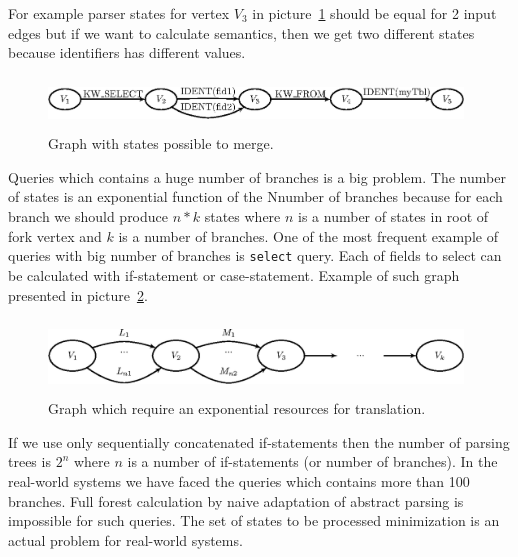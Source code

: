 For example parser states for vertex $V_3$ in picture~\ref{pic4} should be equal for 2 input edges
but if we want to calculate semantics, then we get two different states because identifiers has 
different values.

\begin{figure}
    \begin{center}
        \includegraphics[width=11cm,height=1.4cm]{graphs/states_example.eps}
        \caption{Graph with states possible to merge.}
        \label{pic4}
    \end{center}
\end{figure}

Queries which contains a huge number of branches is a big problem. The number of states is an 
exponential function of the Nnumber of branches because for each branch we should produce $n*k$ 
states where $n$ is a number of states in root of fork vertex and $k$ is a number of branches. 
One of the most frequent example of queries with big number of branches is \verb|select| query. 
Each of fields to select can be calculated with if-statement or case-statement. Example of such 
graph presented in picture~\ref{pic5}.

\begin{figure}
    \begin{center}
        \includegraphics[width=11cm,height=2cm]{graphs/big_res.eps}
        \caption{Graph which require an exponential resources for translation.}
        \label{pic5}
    \end{center}
\end{figure}

If we use only sequentially concatenated if-statements then the number of parsing trees is $2^n$ 
where $n$ is a number of if-statements (or number of branches). In the real-world systems we 
have faced the queries which contains more than 100 branches. Full forest calculation by naive 
adaptation of abstract parsing is impossible for such queries. The set of states to be processed
 minimization is an actual problem for real-world systems.

